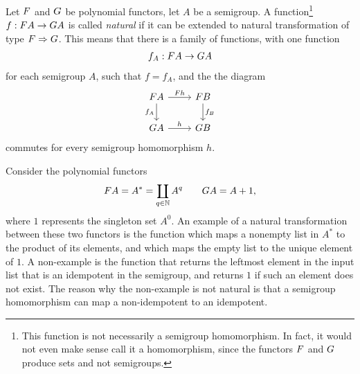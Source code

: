 \begin{definition}\label{def:natural-functions}
    Let $\functor$  and $\functorg$ be polynomial functors, let $A$ be a semigroup. A function\footnote{This function is not necessarily a semigroup homomorphism. In fact, it would not even make sense call it a homomorphism, since the functors $\functor$ and $\functorg$ produce sets and not semigroups.}  $f : \functor A \to \functorg A$ is called \emph{natural} if it can be extended to natural transformation of type $\functor \Rightarrow \functorg$. This means that there is a family of functions, with one function
    \begin{align*}
    f_A : \functor A \to \functorg A
    \end{align*}
    for each semigroup $A$, such  that $f=f_A$, and the the  diagram
    \[
    \begin{tikzcd}
    \functor A 
    \ar[r,"\functor h"]
    \ar[d,"f_A"']
    & 
    \functor B 
    \ar[d,"f_B"]
    \\
    \functorg A 
    \ar[r,"h"]
    &
    \functorg B
    \end{tikzcd}
    \]
    commutes for every semigroup homomorphism $h$.
\end{definition}


\begin{example}
    Consider the polynomial functors 
    \begin{align*}
    \functor A = A^* = \coprod_{q \in \Nat} A^q \qquad \functorg A = A + 1,     \end{align*} 
    where $1$ represents the singleton set $A^0$.
An example of a natural transformation between these two functors is the function which maps a nonempty list in $A^*$ to the product of its elements, and which maps the empty list to the unique element of $1$. A non-example is the function that returns the leftmost element in the input list that is an idempotent in the semigroup, and returns $1$ if such an element does not exist. The reason why the non-example is not natural is that a semigroup homomorphism can map a non-idempotent to an idempotent.
\end{example}


